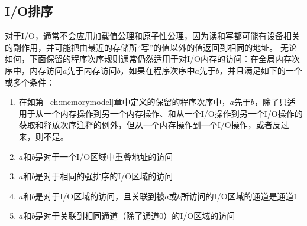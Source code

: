 \subsection{I/O排序}

对于I/O，通常不会应用加载值公理和原子性公理，因为读和写都可能有设备相关的副作用，并可能把由最近的存储所“写”的值以外的值返回到相同的地址。
无论如何，下面保留的程序次序规则通常仍然适用于对I/O内存的访问：在全局内存次序中，内存访问$a$先于内存访问$b$，如果在程序次序中$a$先于$b$，并且满足如下的一个或多个条件：
\begin{enumerate}
  \item 在如第~\ref{ch:memorymodel}章中定义的保留的程序次序中，$a$先于$b$，除了只适用于从一个内存操作到另一个内存操作、和从一个I/O操作到另一个I/O操作的获取和释放次序注释的例外，但从一个内存操作到一个I/O操作，或者反过来，则不是。
  \item $a$和$b$是对于一个I/O区域中重叠地址的访问 
  \item $a$和$b$是对于相同的强排序的I/O区域的访问
  \item $a$和$b$是对于I/O区域的访问，且关联到被$a$或$b$所访问的I/O区域的通道是通道1
  \item $a$和$b$是对于关联到相同通道（除了通道0）的I/O区域的访问
\end{enumerate}

